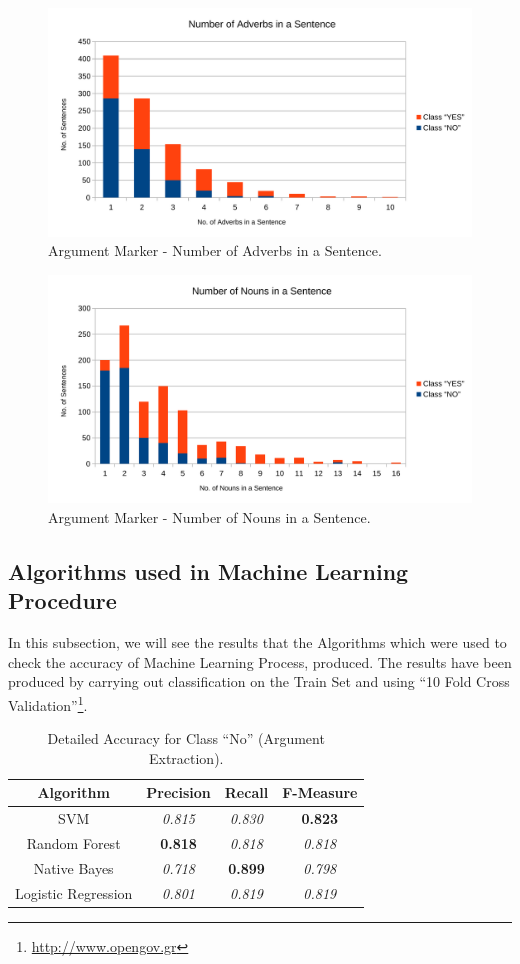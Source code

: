 \begin{figure}[H]
\centering
\includegraphics[width=0.8\linewidth]{figure/arguments/A_adverbs1.pdf}
\caption{Argument Marker - Number of Adverbs in a Sentence.}
\end{figure}

\begin{figure}[H]
\centering
\includegraphics[width=0.8\linewidth]{figure/arguments/A_nouns1.pdf}
\caption{Argument Marker - Number of Nouns in a Sentence.}
\end{figure}

\subsection{Algorithms used in Machine Learning Procedure}\label{412_ref}
In this subsection, we will see the results that the Algorithms which were used to check the accuracy of Machine Learning Process, produced. The results have been produced by carrying out classification on the Train Set and using ``10 Fold Cross Validation''\footnote{\url{http://www.opengov.gr}}.

\begin{table}[H]
\centering
\caption{Detailed Accuracy for Class “No” (Argument Extraction).}
\label{41_table_ref}
\begin{tabular}{cccc}
\hline
{\bf Algorithm}     & {\bf Precision} & {\bf Recall}    & {\bf F-Measure} \\ \hline
SVM                 & {\it 0.815}     & {\it 0.830}     & {\bf 0.823} \\
Random Forest       & {\bf 0.818} 	 & {\it 0.818}     & {\it 0.818}     \\
Native Bayes        & {\it 0.718}     & {\bf 0.899}     & {\it 0.798}     \\
Logistic Regression & {\it 0.801}     & {\it 0.819}     & {\it 0.819}     \\ \hline
\end{tabular}
\end{table}

